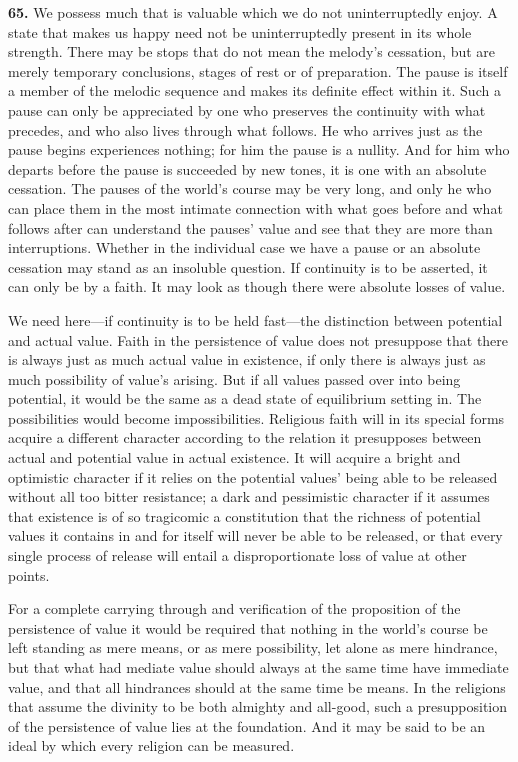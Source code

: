 \documentclass[12pt,a4paper]{book}
\newcommand{\opage}[1]{\marginnote{\footnotesize\textit{[#1]}}}
\begin{document}
\medskip

\noindent\textbf{65.} We possess much that is valuable which we do not uninterruptedly enjoy. A state
that makes us happy need not be uninterruptedly present in its whole strength. There may be stops that
do not mean the melody's cessation, but are merely temporary conclusions, stages of rest or of
preparation. The pause is itself a member of the melodic sequence and makes its definite effect within
it. Such a pause can only be appreciated by one who preserves the continuity with what precedes, and
who also lives through what follows. He who arrives just as the pause 
\opage{150}begins experiences nothing; for
him the pause is a nullity. And for him who departs before the pause is succeeded by new tones, it is
one with an absolute cessation. The pauses of the world's course may be very long, and only he who can
place them in the most intimate connection with what goes before and what follows after can understand
the pauses' value and see that they are more than interruptions. Whether in the individual case we have
a pause or an absolute cessation may stand as an insoluble question. If continuity is to be asserted, it
can only be by a faith. It may look as though there were absolute losses of value.

We need here---if continuity is to be held fast---the distinction between potential and actual value.
Faith in the persistence of value does not presuppose that there is always just as much actual value in
existence, if only there is always just as much possibility of value's arising. But if all values passed
over into being potential, it would be the same as a dead state of equilibrium setting in. The
possibilities would become impossibilities. Religious faith will in its special forms acquire a different
character according to the relation it presupposes between actual and potential value in actual
existence. It will acquire a bright and optimistic character if it relies on the potential values' being
able to be released without all too bitter resistance; a dark and pessimistic character if it assumes
that existence is of so tragicomic a constitution that the richness of potential values it contains in
and for itself will never be able to be released, or that every single process of release will entail a
disproportionate loss of value at other points.

For a complete carrying through and verification of the proposition of the persistence of value it would
be required that nothing in the world's course be left standing as mere means, or as mere possibility,
let alone as mere hindrance, but that what had mediate value should always at the same time have
immediate value, and that all hindrances should at the same time be means. In the religions that assume
the divinity to be both almighty and all-good, such a presupposition of the persistence of value lies at
the foundation. And it may be said to be an ideal by which every religion can be measured.
\end{document}
